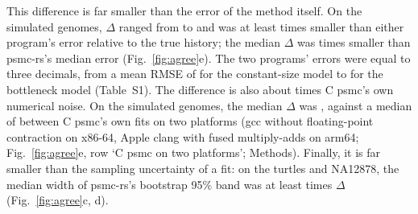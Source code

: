 \documentclass[11pt]{article}
\newcommand{\psmcrs}{psmc-rs}
\newcommand{\Ne}{\ensuremath{N_\mathrm{e}}}
\begin{document}
\begin{table}[tbp]
\centering\small
\caption{\textbf{Agreement between \psmcrs{} and C psmc on every genome both programs fitted, with the same input and settings.} NA12878 is in both the E2 and the E7 rows. $\Delta$, the RMSE (range over genomes), and largest absolute difference $|d_k|$ of $\log_{10}\Ne$, interval by interval over the informative window (Methods); largest relative differences of the scaled mutation rate $\theta$, the scaled recombination rate $\rho$ and the maximum coalescence time $t_{\max}$, of the log-likelihood at the last iteration both programs report, and of the log-likelihood of the first expectation step (E-step), at the shared starting point, where the two agree at about the rounding of the six decimals C psmc prints.}
\label{tab:agreement}
\setlength{\tabcolsep}{3.5pt}

\end{table}

This difference is far smaller than the error of the method itself. On the simulated genomes, $\Delta$ ranged from \EoneRsCRmseMin{} to \EoneRsCRmseMax{} and was at least \EoneFoldMin{} times smaller than either program's error relative to the true history; the median $\Delta$ was \EoneFoldMedian{} times smaller than \psmcrs{}'s median error (Fig.~\ref{fig:agree}e). The two programs' errors were equal to three decimals, from a mean RMSE of \EoneConstantTruthRs{} for the constant-size model to \EoneBottleneckTruthRs{} for the bottleneck model (Table~S1). The difference is also about \DiagOverCBuildsW{} times C psmc's own numerical noise. On the simulated genomes, the median $\Delta$ was \DiagMedianDefault{}, against a median of \DiagCBuildsMedian{} between C psmc's own fits on two platforms (gcc without floating-point contraction on x86-64, Apple clang with fused multiply-adds on arm64; Fig.~\ref{fig:agree}e, row `C psmc on two platforms'; Methods). Finally, it is far smaller than the sampling uncertainty of a fit: on the turtles and NA12878, the median width of \psmcrs{}'s bootstrap 95\% band was at least \EtwoBandOverDeltaMin{} times $\Delta$ (Fig.~\ref{fig:agree}c, d).
\end{document}
